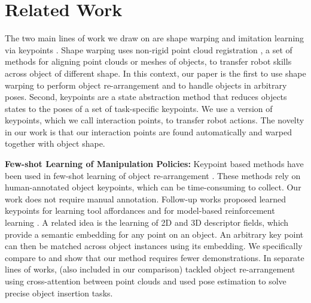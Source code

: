 \documentclass{article}
\begin{document}
\section{Related Work}

The two main lines of work we draw on are shape warping \cite{rodriguez18transferring,thompson21shapebased} and imitation learning via keypoints \cite{manuelli19kpam}. Shape warping uses non-rigid point cloud registration \cite{huang21comprehensive}, a set of methods for aligning point clouds or meshes of objects, to transfer robot skills across object of different shape. In this context, our paper is the first to use shape warping to perform object re-arrangement and to handle objects in arbitrary poses. Second, keypoints are a state abstraction method that reduces objects states to the poses of a set of task-specific keypoints.
We use a version of keypoints, which we call interaction points, to transfer robot actions. The novelty in our work is that our interaction points are found automatically and warped together with object shape.

\textbf{Few-shot Learning of Manipulation Policies:} Keypoint based methods have been used in few-shot learning of object re-arrangement \cite{manuelli19kpam,gao21kpam,gao21kpamsc}. These methods rely on human-annotated object keypoints, which can be time-consuming to collect. Our work does not require manual annotation. Follow-up works proposed learned keypoints for learning tool affordances \cite{qin20keto,vecerik20s3k,turpin21gift} and for model-based reinforcement learning \cite{manuelli20keypoints}. A related idea is the learning of 2D \cite{florence18dense} and 3D \cite{simeonov22neural,simeonov22se,ryu22equivariant,chun23local} descriptor fields, which provide a semantic embedding for any point on an object. An arbitrary key point can then be matched across object instances using its embedding. We specifically compare to \citet{simeonov22neural,simeonov22se} and show that our method requires fewer demonstrations. In separate lines of works, \citet{pan22taxpose} (also included in our comparison) tackled object re-arrangement using cross-attention \cite{vaswani17attention} between point clouds and \citet{wen22you} used pose estimation to solve precise object insertion tasks. %
\end{document}
